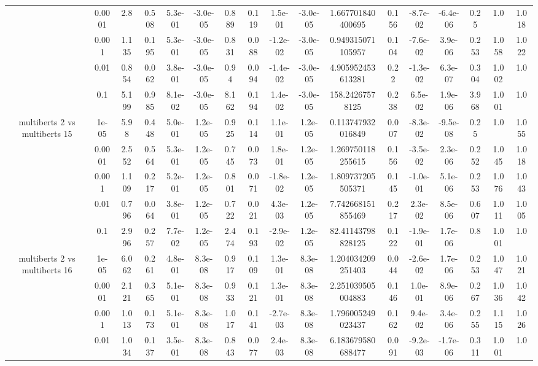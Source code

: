\begin{tabular}{|c|c|c|c|c|c|c|c|c|c|c|c|c|c|c|c|c|}
 & 0.0001 & 2.8 & 0.508 & 5.3e-01 & -3.0e-05 & 0.889 & 0.119 & 1.5e-01 & -3.0e-05 & 1.667701840400695 & 0.156 & -8.7e-02 & -6.4e-06 & 0.25 & 1.0 & 1.018 \\
 & 0.001 & 1.135 & 0.195 & 5.3e-01 & -3.0e-05 & 0.831 & 0.088 & -1.2e-02 & -3.0e-05 & 0.949315071105957 & 0.104 & -7.6e-02 & 3.9e-06 & 0.253 & 1.058 & 1.022 \\
 & 0.01 & 0.854 & 0.062 & 3.8e-01 & -3.0e-05 & 0.94 & 0.094 & -1.4e-02 & -3.0e-05 & 4.905952453613281 & 0.22 & -1.3e-02 & 6.3e-07 & 0.304 & 1.002 & 1.0 \\
 & 0.1 & 5.199 & 0.985 & 8.1e-02 & -3.0e-05 & 8.162 & 0.194 & 1.4e-02 & -3.0e-05 & 158.24267578125 & 0.238 & 6.5e-02 & 1.9e-06 & 3.968 & 1.001 & 1.0 \\
\hline
\multirow{5}{*}{multiberts 2 vs multiberts 15} & 1e-05 & 5.98 & 0.448 & 5.0e-01 & 1.2e-05 & 0.925 & 0.114 & 1.1e-01 & 1.2e-05 & 0.113747932016849 & 0.007 & -8.3e-02 & -9.5e-08 & 0.25 & 1.0 & 1.055 \\
 & 0.0001 & 2.552 & 0.564 & 5.3e-01 & 1.2e-05 & 0.745 & 0.073 & 1.8e-01 & 1.2e-05 & 1.269750118255615 & 0.156 & -3.5e-02 & 2.3e-06 & 0.252 & 1.045 & 1.018 \\
 & 0.001 & 1.109 & 0.217 & 5.2e-01 & 1.2e-05 & 0.801 & 0.071 & -1.8e-02 & 1.2e-05 & 1.809737205505371 & 0.145 & -1.0e-01 & 5.1e-06 & 0.253 & 1.076 & 1.043 \\
 & 0.01 & 0.796 & 0.064 & 3.8e-01 & 1.2e-05 & 0.722 & 0.021 & 4.3e-03 & 1.2e-05 & 7.742668151855469 & 0.217 & 2.3e-02 & 8.5e-06 & 0.607 & 1.011 & 1.005 \\
 & 0.1 & 2.996 & 0.257 & 7.7e-02 & 1.2e-05 & 2.474 & 0.193 & -2.9e-02 & 1.2e-05 & 82.41143798828125 & 0.122 & -1.9e-01 & 1.7e-06 & 0.8 & 1.001 & 1.0 \\
\hline
\multirow{5}{*}{multiberts 2 vs multiberts 16} & 1e-05 & 6.062 & 0.261 & 4.8e-01 & 8.3e-08 & 0.917 & 0.109 & 1.3e-01 & 8.3e-08 & 1.204034209251403 & 0.044 & -2.6e-02 & 1.7e-06 & 0.253 & 1.047 & 1.021 \\
 & 0.0001 & 2.121 & 0.365 & 5.1e-01 & 8.3e-08 & 0.933 & 0.121 & 1.3e-01 & 8.3e-08 & 2.251039505004883 & 0.146 & 1.0e-01 & 8.9e-06 & 0.267 & 1.036 & 1.042 \\
 & 0.001 & 1.013 & 0.173 & 5.1e-01 & 8.3e-08 & 1.017 & 0.141 & -2.7e-03 & 8.3e-08 & 1.796005249023437 & 0.162 & 9.4e-02 & 3.4e-06 & 0.255 & 1.115 & 1.026 \\
 & 0.01 & 1.034 & 0.137 & 3.5e-01 & 8.3e-08 & 0.843 & 0.077 & 2.4e-03 & 8.3e-08 & 6.183679580688477 & 0.091 & -9.2e-03 & -1.7e-06 & 0.311 & 1.001 & 1.0 \\

\end{tabular}
